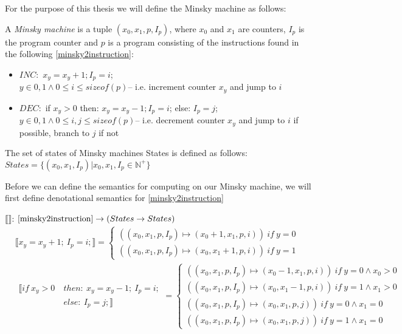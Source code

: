 For the purpose of this thesis we will define the Minsky machine as follows:
\begin{definition}
A \emph{Minsky machine} is a tuple $(x_0, x_1, p, I_p)$, where $x_0$ and $x_1$ are counters, $I_p$ is the program counter and $p$ is a program consisting of the instructions found in the following \autoref{minsky2instruction}:
\begin{instructionset}
\label{minsky2instruction}
\hfill
\begin{itemize}
\item{$INC:$} $x_y = x_y + 1; I_p = i$;
\\ $ y\in{0,1} \land 0 \leq i \leq sizeof(p)$\hfill\break -- i.e. increment counter $x_y$ and jump to $i$
\item{$DEC:$} if $x_y > 0$ then: $x_y = x_y - 1; I_p = i$; else: $I_p = j$;\\
$ y\in{0,1} \land 0 \leq i,j \leq sizeof(p)$\hfill\break -- i.e. decrement counter $x_y$ and jump to $i$ if possible, branch to $j$ if not
\end{itemize}
\end{instructionset}

The set of states of Minsky machines States is defined as follows:
$States = \{(x_0, x_1, I_p) | x_0, x_1, I_p \in\mathbb{N}^+\}$
\end{definition}
Before we can define the semantics for computing on our Minsky machine, we will first define denotational semantics for \autoref{minsky2instruction}
\begin{definition}
$\llbracket\rrbracket$: $\autoref{minsky2instruction} \rightarrow (States \rightarrow States)$
\begin{align*}
&\llbracket x_y = x_y + 1; \ I_p = i; \rrbracket  = \begin{cases}
																		((x_0, x_1, p, I_p) \mapsto (x_0+1, x_1, p, i))\ if \ y=0\\
																		((x_0, x_1, p, I_p) \mapsto (x_0, x_1+1, p, i))\ if \ y=1
																		\end{cases}\\
&\begin{aligned}
\llbracket if \ x_y > 0 \  &then: \ x_y = x_y - 1; \ I_p = i; \\
										&else: \ I_p = j; \rrbracket
\end{aligned} =
																		\begin{cases}
																		((x_0, x_1, p, I_p) \mapsto (x_0-1, x_1, p, i))\ if \ y=0\land x_0>0\\
																		((x_0, x_1, p, I_p) \mapsto (x_0, x_1-1, p, i))\ if \ y=1\land x_1>0\\
																		((x_0, x_1, p, I_p) \mapsto (x_0, x_1, p, j))\ if \ y=0\land x_1=0\\
																		((x_0, x_1, p, I_p) \mapsto (x_0, x_1, p, j))\ if \ y=1\land x_1=0
																		\end{cases}
\end{align*}
\end{definition}

